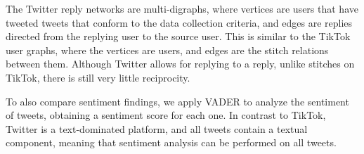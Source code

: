 \begin{comment}
    
In the following paragraphs, we outline the most significant details of the data composition. 

\textbf{Election}:
This dataset, sourced from \cite{kerchner2020coronavirus}, includes 51,425 tweets. Tweets were filtered to include only those linking to URLs on \href{https://www.mediabiasfactcheck.com/}{www.mediabiasfactcheck.com}. 
Users who tweeted less than three times were excluded to maintain consistency.

\textbf{Gun Control, Obamacare, and Abortion Networks}:
Based on \cite{garimella2018political}, this dataset focuses on three major events:
\begin{itemize}
    \item \textbf{Gun Control:} Democrat filibuster for gun control reforms (June 12–18, 2016), containing 7,811 tweets.
    \item \textbf{Obamacare:} Supreme Court ruling on subsidies (June 22–29, 2015), with 970 tweets.
    \item \textbf{Abortion:} Supreme Court strikes down Texas abortion restrictions (June 27–July 3, 2016), with 36,045 tweets. 
\end{itemize}
These tweets were collected within a 3-day window before and after each event and filtered using specific keywords from \cite{lu2015biaswatch}. 

Finally, we obtained two networks related to the \textbf{presidential debates} of 2012: one from the second presidential debate, consisting of $37,849$ tweets, and another from the vice presidential debate, containing $32,194$ tweets.
\end{comment}

The Twitter reply networks are multi-digraphs, where vertices are users that have tweeted tweets that conform to the data collection criteria, and edges are replies directed from the replying user to the source user. This is similar to the TikTok user graphs, where the vertices are users, and edges are the stitch relations between them. Although Twitter allows for replying to a reply, unlike stitches on TikTok, there is still very little reciprocity. %

To also compare sentiment findings, we apply VADER to analyze the sentiment of tweets, obtaining a sentiment score for each one. In contrast to TikTok, Twitter is a text-dominated platform, and all tweets contain a textual component, meaning that sentiment analysis can be performed on all tweets. 

